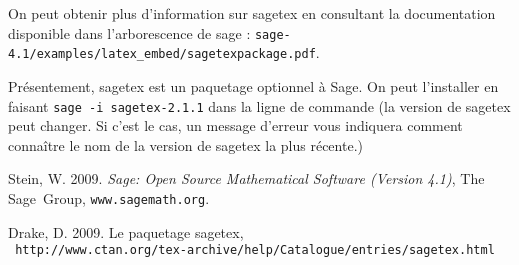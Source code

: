 \documentclass{article}
\begin{document}
On peut obtenir plus d'information sur sagetex en consultant la documentation disponible dans l'arborescence de sage : {\tt sage-4.1/examples/latex\_embed/sagetexpackage.pdf}.

Présentement, sagetex est un paquetage optionnel à Sage. On peut l'installer en faisant {\tt sage -i sagetex-2.1.1} dans la ligne de commande (la version de sagetex peut changer. Si c'est le cas, un message d'erreur vous indiquera comment connaître le nom de la version de sagetex la plus récente.)

\begin{thebibliography}{0}

Stein, W. 2009. \emph{Sage: {O}pen {S}ource {M}athematical {S}oftware
({V}ersion 4.1)}, The Sage~Group, {\tt www.sagemath.org}.

Drake, D. 2009. Le paquetage sagetex,\\ {\tt
http://www.ctan.org/tex-archive/help/Catalogue/entries/sagetex.html}

\end{thebibliography}
\end{document}
